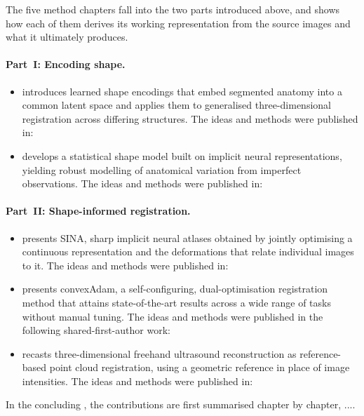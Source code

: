 The five method chapters fall into the two parts introduced above, and  shows how each of them derives its working representation from the source images and what it ultimately produces.

\paragraph{Part~I: Encoding shape.}
\begin{itemize}
    \item {} introduces learned shape encodings that embed segmented anatomy into a common latent space and applies them to generalised three-dimensional registration across differing structures. The ideas and methods were published in:

    \vspace{0.5em}
    \noindent{}

    \item {} develops a statistical shape model built on implicit neural representations, yielding robust modelling of anatomical variation from imperfect observations. The ideas and methods were published in:

    \vspace{0.5em}
    \noindent{}
\end{itemize}

\paragraph{Part~II: Shape-informed registration.}
\begin{itemize}
    \item {} presents \mbox{SINA}, sharp implicit neural atlases obtained by jointly optimising a continuous representation and the deformations that relate individual images to it. The ideas and methods were published in:

    \vspace{0.5em}
    \noindent{}

    \item {} presents convexAdam, a self-configuring, dual-optimisation registration method that attains state-of-the-art results across a wide range of tasks without manual tuning. The ideas and methods were published in the following shared-first-author work:

    \vspace{0.5em}
    \noindent{}

    \item {} recasts three-dimensional freehand ultrasound reconstruction as reference-based point cloud registration, using a geometric reference in place of image intensities. The ideas and methods were published in:

    \vspace{0.5em}
    \noindent{}
\end{itemize}

In the concluding , the contributions are first summarised chapter by chapter, .... 
